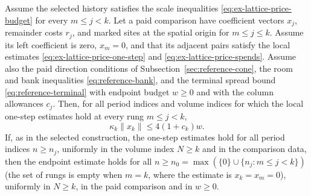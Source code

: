 \begin{proposition}
\label{prop:ex-lattice-trace-sharp-read}
Assume the selected history satisfies the scale inequalities
\eqref{eq:ex-lattice-price-budget} for every \(m\leq j<k\). Let a paid
comparison have coefficient vectors \(x_j\), remainder costs \(r_j\),
and marked sites at the spatial origin for \(m\leq j\leq k\). Assume
its left coefficient is zero, \(x_m=0\), and that its adjacent pairs
satisfy the local estimates \eqref{eq:ex-lattice-price-one-step} and
\eqref{eq:ex-lattice-price-spends}. Assume also the paid direction
conditions of Subsection~\ref{sec:reference-cone}, the room and bank
inequalities \eqref{eq:reference-bank}, and the terminal spread bound
\eqref{eq:reference-terminal} with endpoint budget \(w\geq0\) and with
the column allowances \(c_j\). Then,
for all period indices and volume indices for which the local one-step
estimates hold at every rung \(m\leq j<k\),
\begin{equation}
 \kappa_k\|x_k\|\leq4(1+c_k)w.
 \label{eq:ex-lattice-price-endpoint}
\end{equation}
If, as in the selected construction, the one-step estimates hold for all
period indices \(n\geq n_j\), uniformly in the volume index \(N\geq k\) and
in the comparison data, then the endpoint estimate holds for all
\(n\geq n_0=\max(\{0\}\cup\{n_j:m\leq j<k\})\) (the set of rungs is empty
when \(m=k\), where the estimate is \(x_k=x_m=0\)), uniformly in \(N\geq k\), in the paid
comparison and in \(w\geq0\).
\end{proposition}

